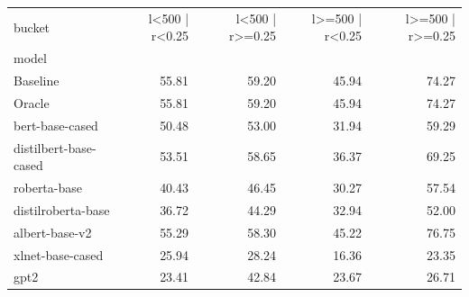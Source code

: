 \begin{tabular}{lrrrr}
\toprule
bucket & l<500 | r<0.25 & l<500 | r>=0.25 & l>=500 | r<0.25 & l>=500 | r>=0.25 \\
model &  &  &  &  \\
\midrule
Baseline & 55.81 & 59.20 & 45.94 & 74.27 \\
Oracle & 55.81 & 59.20 & 45.94 & 74.27 \\
bert-base-cased & 50.48 & 53.00 & 31.94 & 59.29 \\
distilbert-base-cased & 53.51 & 58.65 & 36.37 & 69.25 \\
roberta-base & 40.43 & 46.45 & 30.27 & 57.54 \\
distilroberta-base & 36.72 & 44.29 & 32.94 & 52.00 \\
albert-base-v2 & 55.29 & 58.30 & 45.22 & 76.75 \\
xlnet-base-cased & 25.94 & 28.24 & 16.36 & 23.35 \\
gpt2 & 23.41 & 42.84 & 23.67 & 26.71 \\
\bottomrule
\end{tabular}

